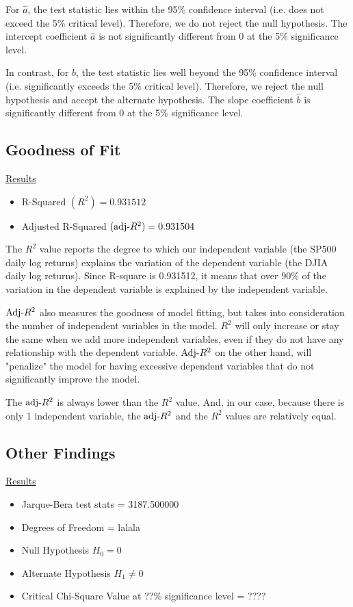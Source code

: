 \documentclass[a4paper]{article}
\begin{document}
	For $\hat{a}$, the test statistic lies within the 95\% confidence interval (i.e. does not exceed the 5\% critical level). Therefore, we do not reject the null hypothesis. The intercept coefficient $\hat{a}$ is not significantly different from 0 at the 5\% significance level.
	
	In contrast, for $\hat{b}$, the test statistic lies well beyond the 95\% confidence interval (i.e. significantly exceeds the 5\% critical level). Therefore, we reject the null hypothesis and accept the alternate hypothesis. The slope coefficient $\hat{b}$ is significantly different from 0 at the 5\% significance level.
	
	\subsection{Goodness of Fit}
	\underline{Results}
	\begin{itemize}[nosep]
		\item R-Squared $(R^2) = 0.931512$
		\item Adjusted R-Squared $(\textnormal{adj-}R^2) = 0.931504$
	\end{itemize}

	The $R^2$ value reports the degree to which our independent variable (the SP500 daily log returns) explains the variation of the dependent variable (the DJIA daily log returns). Since R-square is 0.931512, it means that over 90\% of the variation in the dependent variable is explained by the independent variable.
	
	$\textnormal{Adj-}R^2$ also measures the goodness of model fitting, but takes into consideration the number of independent variables in the model. $R^2$ will only increase or  stay the same when we add more independent variables, even if they do not have any relationship with the dependent variable. $\textnormal{Adj-}R^2$ on the other hand, will "penalize" the model for having excessive dependent variables that do not significantly improve the model. 
	
	The $\textnormal{adj-}R^2$ is always lower than the $R^2$ value. And, in our case, because there is only 1 independent variable, the $\textnormal{adj-}R^2$ and the $R^2$ values are relatively equal.
	
	\subsection{Other Findings}
	\underline{Results}
	\begin{itemize}[nosep]
		\item Jarque-Bera test stats = 3187.500000
		\item Degrees of Freedom = lalala
		\item Null Hypothesis $H_0 = 0$
		\item Alternate Hypothesis $H_1 \ne 0$
		\item Critical Chi-Square Value at ??\% significance level = ????
	\end{itemize}
	
\end{document}
